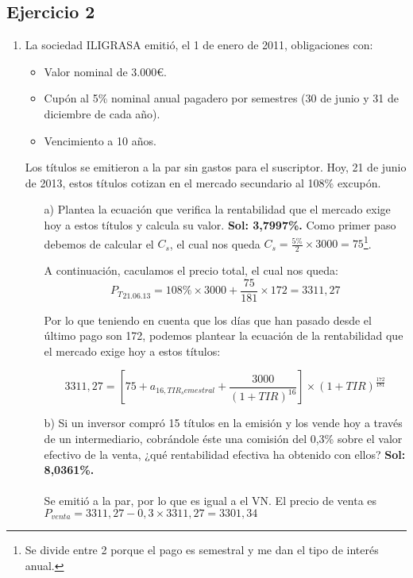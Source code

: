 

\subsection*{Ejercicio 2}

\begin{enumerate}
    \item La sociedad ILIGRASA emitió, el 1 de enero de 2011, obligaciones con:
    \begin{itemize}
        \item Valor nominal de 3.000€.
        \item Cupón al 5\% nominal anual pagadero por semestres (30 de junio y 31 de diciembre de cada año).
        \item Vencimiento a 10 años.
    \end{itemize}
    Los títulos se emitieron a la par sin gastos para el suscriptor. Hoy, 21 de junio de 2013, estos títulos cotizan en el mercado secundario al 108\% excupón.

    \begin{enumerate}
        \item[a)] Plantea la ecuación que verifica la rentabilidad que el mercado exige hoy a estos títulos y calcula su valor. \textbf{Sol: 3,7997\%.}
        Como primer paso debemos de calcular el $C_s$, el cual nos queda $C_s = \frac{5\%}{2} \times 3000 = 75$\footnote{Se divide entre 2 porque el pago es semestral y me dan el tipo de interés anual.}. 

        A continuación, caculamos el precio total, el cual nos queda:
        \begin{equation*}
            {P_T}_{\textit{21.06.13}} = 108\% \times 3000 + \frac{75}{181} \times 172 = 3311,27
        \end{equation*}

        Por lo que teniendo en cuenta que los días que han pasado desde el último pago son 172, podemos plantear la ecuación de la rentabilidad que el mercado exige hoy a estos títulos:

        \begin{equation*}
            3311,27 = \left[75 + a_{16,TIR_semestral} + \frac{3000}{(1+TIR)^{16}}\right] \times (1+TIR)^{\frac{172}{181}}
        \end{equation*}
        \item[b)] Si un inversor compró 15 títulos en la emisión y los vende hoy a través de un intermediario, cobrándole éste una comisión del 0,3\% sobre el valor efectivo de la venta, ¿qué rentabilidad efectiva ha obtenido con ellos? \textbf{Sol: 8,0361\%.}\\\\
        Se emitió a la par, por lo que es igual a el VN.
        El precio de venta es $ P_{venta} = 3311,27 -0,3 \times 3311,27 = 3301,34$


\end{enumerate}
\end{enumerate}

